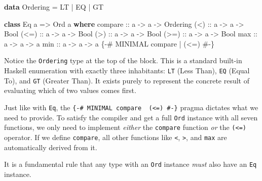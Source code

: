 \documentclass[
]{article}
\newenvironment{Shaded}{}{}
\newcommand{\DataTypeTok}[1]{\textcolor[rgb]{0.56,0.13,0.00}{#1}}
\newcommand{\KeywordTok}[1]{\textcolor[rgb]{0.00,0.44,0.13}{\textbf{#1}}}
\newcommand{\NormalTok}[1]{#1}
\newcommand{\OperatorTok}[1]{\textcolor[rgb]{0.40,0.40,0.40}{#1}}
\newcommand{\OtherTok}[1]{\textcolor[rgb]{0.00,0.44,0.13}{#1}}
\begin{document}
\begin{Shaded}
\begin{Highlighting}[]
\KeywordTok{data} \DataTypeTok{Ordering} \OtherTok{=} \DataTypeTok{LT} \OperatorTok{|} \DataTypeTok{EQ} \OperatorTok{|} \DataTypeTok{GT}

\KeywordTok{class} \DataTypeTok{Eq}\NormalTok{ a }\OtherTok{=\textgreater{}} \DataTypeTok{Ord}\NormalTok{ a }\KeywordTok{where}
\OtherTok{    compare ::}\NormalTok{ a }\OtherTok{{-}\textgreater{}}\NormalTok{ a }\OtherTok{{-}\textgreater{}} \DataTypeTok{Ordering}
\OtherTok{    (\textless{})     ::}\NormalTok{ a }\OtherTok{{-}\textgreater{}}\NormalTok{ a }\OtherTok{{-}\textgreater{}} \DataTypeTok{Bool}
\OtherTok{    (\textless{}=)    ::}\NormalTok{ a }\OtherTok{{-}\textgreater{}}\NormalTok{ a }\OtherTok{{-}\textgreater{}} \DataTypeTok{Bool}
\OtherTok{    (\textgreater{})     ::}\NormalTok{ a }\OtherTok{{-}\textgreater{}}\NormalTok{ a }\OtherTok{{-}\textgreater{}} \DataTypeTok{Bool}
\OtherTok{    (\textgreater{}=)    ::}\NormalTok{ a }\OtherTok{{-}\textgreater{}}\NormalTok{ a }\OtherTok{{-}\textgreater{}} \DataTypeTok{Bool}
\OtherTok{    max     ::}\NormalTok{ a }\OtherTok{{-}\textgreater{}}\NormalTok{ a }\OtherTok{{-}\textgreater{}}\NormalTok{ a}
\OtherTok{    min     ::}\NormalTok{ a }\OtherTok{{-}\textgreater{}}\NormalTok{ a }\OtherTok{{-}\textgreater{}}\NormalTok{ a}
    \OtherTok{\{{-}\# MINIMAL compare | (\textless{}=) \#{-}\}}
\end{Highlighting}
\end{Shaded}

Notice the \texttt{Ordering} type at the top of the block. This is a
standard built-in Haskell enumeration with exactly three inhabitants:
\texttt{LT} (Less Than), \texttt{EQ} (Equal To), and \texttt{GT}
(Greater Than). It exists purely to represent the concrete result of
evaluating which of two values comes first.

Just like with \texttt{Eq}, the
\texttt{\{-\#\ MINIMAL\ compare\ \textbar{}\ (\textless{}=)\ \#-\}}
pragma dictates what we need to provide. To satisfy the compiler and get
a full \texttt{Ord} instance with all seven functions, we only need to
implement \emph{either} the \texttt{compare} function \emph{or} the
\texttt{(\textless{}=)} operator. If we define \texttt{compare}, all
other functions like \texttt{\textless{}}, \texttt{\textgreater{}}, and
\texttt{max} are automatically derived from it.

It is a fundamental rule that any type with an \texttt{Ord} instance
\emph{must} also have an \texttt{Eq} instance.
\end{document}
